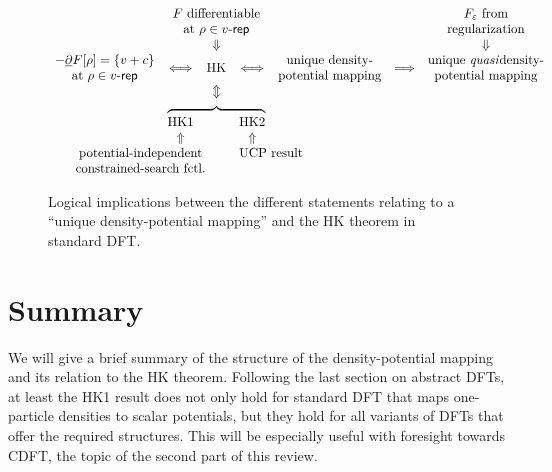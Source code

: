 \documentclass[journal=apcach,manuscript=article,layout=twocolumn]{achemso}
\newcommand{\eps}{\varepsilon}
\newcommand{\vrep}{\ensuremath{v\text{-}\mathsf{rep}}}
\newcommand{\changed}[1] {{ {#1}}} %
\begin{document}
\begin{figure*}[ht!]
\begin{equation*}
\begin{array}{ccccccc}
    & \multicolumn{3}{c}{\text{$F$ differentiable}} &&&
        \text{$F_\eps$ from} \\
    & \multicolumn{3}{c}{\text{at $\rho \in \vrep$}} &&&
        \text{regularization} \\
    & & \Downarrow &&&& \Downarrow \\
    -\underline\partial F[\rho] = \{v+c\} &
        \multirow{2}{*}{$\Longleftrightarrow$} & 
        \multirow{2}{*}{HK} &
        \multirow{2}{*}{$\Longleftrightarrow$} &
        \text{unique density-} &
        \multirow{2}{*}{$\Longrightarrow$} &
        \text{unique \emph{quasi}density-} \\
    \text{at $\rho \in \vrep$} &&&&
        \text{potential mapping} &&
        \text{potential mapping} \\
    && \Updownarrow \\
    & \multicolumn{3}{c}{$\downbracefill$} \\
    & \text{HK1} && \text{HK2} \\
    & \Uparrow && \Uparrow \\
    \multicolumn{3}{c}{$\text{potential-independent}$} & \multicolumn{2}{l}{$\text{UCP result}$} \\
    \multicolumn{3}{c}{$\text{constrained-search fctl.}$}  
\end{array}
\end{equation*}
\caption{Logical implications between the different statements relating to a ``unique density-potential mapping'' and the \changed{HK} theorem in standard DFT.}
\label{fig:HK-structure}
\end{figure*}


\section{Summary}
\label{sec:summary}

We will give a brief summary of the structure of the density-potential mapping and its relation to the \changed{HK} theorem. Following the last section on abstract DFTs, at least the HK1 result does not only hold for standard DFT that maps one-particle densities to scalar potentials, but they hold for all variants of DFTs that offer the required structures. This will be especially useful with foresight towards CDFT, the topic of the second part of this review.
\end{document}
